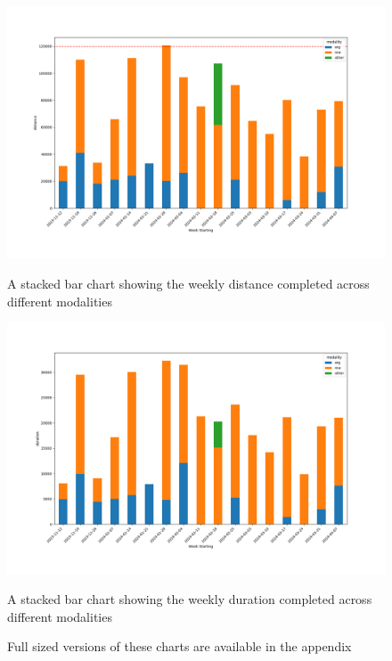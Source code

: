 \begin{figure}[htbp]
  \centering
  \begin{minipage}[c]{0.45\textwidth}
    \centering
    \includegraphics[width=\linewidth]{figures/distanceVsMod.png}
    \captionsetup{justification=centering}
    \caption[Distance by Modality]{\label{fig:distanceVsMod}A stacked bar chart showing the weekly distance completed across different modalities}
  \end{minipage}
  \begin{minipage}[c]{0.45\textwidth}
    \centering
    \includegraphics[width=\linewidth]{figures/durationVsMod.png}
    \captionsetup{justification=centering}
    \caption[Duration by Modality]{\label{fig:durationVsMod}A stacked bar chart showing the weekly duration completed across different modalities}
  \end{minipage}
  \caption*{Full sized versions of these charts are available in the appendix}
\end{figure}

